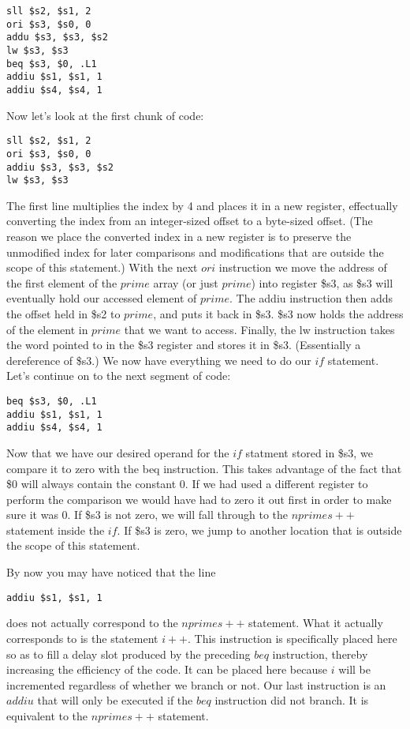 \documentclass[11pt]{article}
\begin{document}
\begin{verbatim}
sll $s2, $s1, 2
ori $s3, $s0, 0
addu $s3, $s3, $s2
lw $s3, $s3
beq $s3, $0, .L1
addiu $s1, $s1, 1
addiu $s4, $s4, 1
\end{verbatim}

Now let's look at the first chunk of code:

\begin{verbatim}
sll $s2, $s1, 2
ori $s3, $s0, 0
addiu $s3, $s3, $s2
lw $s3, $s3
\end{verbatim}

The first line multiplies the index by 4 and places it in a new register, effectually converting the index from an integer-sized offset to a byte-sized offset. (The reason we place the converted index in a new register is to preserve the unmodified index for later comparisons and modifications that are outside the scope of this statement.) With the next $ori$ instruction we move the address of the first element of the $prime$ array (or just $prime$) into register \$s3, as \$s3 will eventually hold our accessed element of $prime$. The addiu instruction then adds the offset held in \$s2 to $prime$, and puts it back in \$s3. \$s3 now holds the address of the element in $prime$ that we want to access. Finally, the lw instruction takes the word pointed to in the \$s3 register and stores it in \$s3. (Essentially a dereference of \$s3.) We now have everything we need to do our $if$ statement. Let's continue on to the next segment of code:

\begin{verbatim}
beq $s3, $0, .L1
addiu $s1, $s1, 1
addiu $s4, $s4, 1
\end{verbatim}

Now that we have our desired operand for the $if$ statment stored in \$s3, we compare it to zero with the beq instruction. This takes advantage of the fact that \$0 will always contain the constant 0. If we had used a different register to perform the comparison we would have had to zero it out first in order to make sure it was 0. If \$s3 is not zero, we will fall through to the $nprimes++$ statement inside the $if$. If \$s3 is zero, we jump to another location that is outside the scope of this statement. 

By now you may have noticed that the line

\begin{verbatim}
addiu $s1, $s1, 1
\end{verbatim}

does not actually correspond to the $nprimes++$ statement. What it actually corresponds to is the statement $i++$. This instruction is specifically placed here so as to fill a delay slot produced by the preceding $beq$ instruction, thereby increasing the efficiency of the code. It can be placed here because $i$ will be incremented regardless of whether we branch or not. Our last instruction is an $addiu$ that will only be executed if the $beq$ instruction did not branch. It is equivalent to the $nprimes++$ statement.
\end{document}
